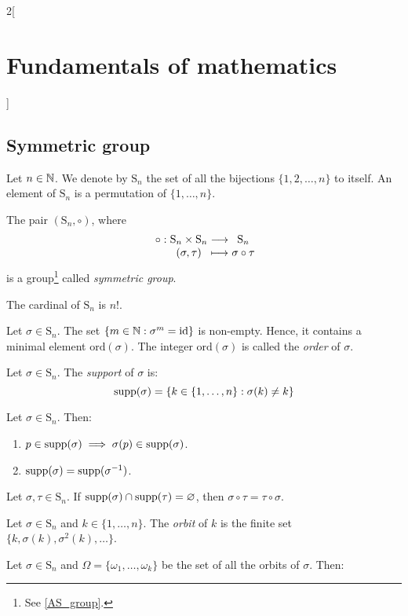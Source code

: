 \documentclass[../../../main.tex]{subfiles}
\begin{document}
\begin{multicols}{2}[\section{Fundamentals of mathematics}]
  \subsection{Symmetric group}
  \begin{definition}
    Let $n\in\mathbb{N}$. We denote by $\text{S}_n$ the set of all the bijections $\{1,2,\ldots,n\}$ to itself. An element of $\text{S}_n$ is a permutation of $\{1,\ldots,n\}$.
  \end{definition}
  \begin{proposition}
    The pair $(\text{S}_n,\circ)$, where
    $$\function{\circ}{\text{S}_n\times \text{S}_n}{\text{S}_n}{(\sigma,\tau)}{\sigma\circ\tau}$$
    is a group\footnote{See \cref{AS_group}.} called \emph{symmetric group}.
  \end{proposition}
  \begin{theorem}
    The cardinal of $\text{S}_n$ is $n!$.
  \end{theorem}
  \begin{definition}
    Let $\sigma\in \text{S}_n$. The set $\{m\in\mathbb{N}:\sigma^m=\text{id}\}$ is non-empty. Hence, it contains a minimal element $\text{ord}(\sigma)$. The integer $\text{ord}(\sigma)$ is called the \emph{order} of $\sigma$.
  \end{definition}
  \begin{definition}
    Let $\sigma\in \text{S}_n$. The \emph{support} of $\sigma$ is: $$\operatorname{supp}(\sigma)=\{k\in\{1,\ldots,n\}: \sigma(k)\ne k\}$$
  \end{definition}
  \begin{lemma}
    Let $\sigma\in \text{S}_n$. Then:
    \begin{enumerate}
      \item $p\in\operatorname{supp}(\sigma)\implies \sigma(p)\in\operatorname{supp}(\sigma)$.
      \item $\operatorname{supp}(\sigma)=\operatorname{supp}(\sigma^{-1})$.
    \end{enumerate}
  \end{lemma}
  \begin{lemma}
    Let $\sigma,\tau\in \text{S}_n$. If $\operatorname{supp}(\sigma)\cap\operatorname{supp}(\tau)=\varnothing$, then $\sigma\circ \tau=\tau\circ \sigma$.
  \end{lemma}
  \begin{definition}
    Let $\sigma\in \text{S}_n$ and $k\in\{1,\ldots,n\}$. The \emph{orbit} of $k$ is the finite set $\{k,\sigma(k),\sigma^2(k),\ldots\}$.
  \end{definition}
  \begin{theorem}
    Let $\sigma\in \text{S}_n$ and $\Omega=\{\omega_1,\ldots,\omega_k\}$ be the set of all the orbits of $\sigma$. Then:

\end{theorem}
\end{multicols}
\end{document}
